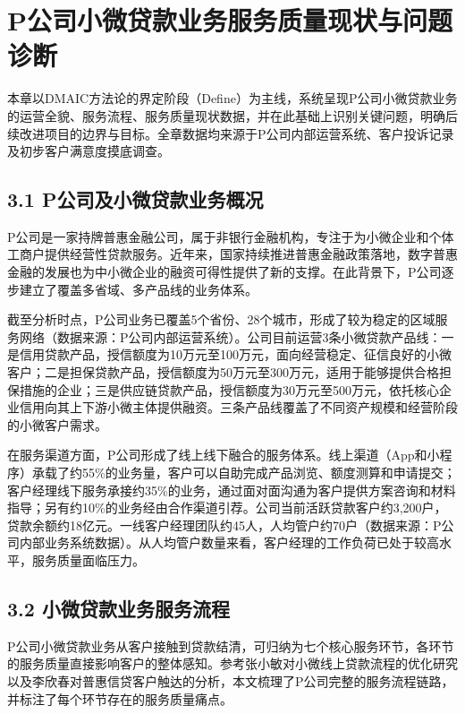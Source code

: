 \chapter{P公司小微贷款业务服务质量现状与问题诊断}

本章以DMAIC方法论的界定阶段（Define）为主线，系统呈现P公司小微贷款业务的运营全貌、服务流程、服务质量现状数据，并在此基础上识别关键问题，明确后续改进项目的边界与目标。全章数据均来源于P公司内部运营系统、客户投诉记录及初步客户满意度摸底调查。\par

\section{3.1 P公司及小微贷款业务概况}

P公司是一家持牌普惠金融公司，属于非银行金融机构，专注于为小微企业和个体工商户提供经营性贷款服务。近年来，国家持续推进普惠金融政策落地，数字普惠金融的发展也为中小微企业的融资可得性提供了新的支撑\cite{ref7,ref2}。在此背景下，P公司逐步建立了覆盖多省域、多产品线的业务体系。\par

截至分析时点，P公司业务已覆盖5个省份、28个城市，形成了较为稳定的区域服务网络（数据来源：P公司内部运营系统）。公司目前运营3条小微贷款产品线：一是信用贷款产品，授信额度为10万元至100万元，面向经营稳定、征信良好的小微客户；二是担保贷款产品，授信额度为50万元至300万元，适用于能够提供合格担保措施的企业；三是供应链贷款产品，授信额度为30万元至500万元，依托核心企业信用向其上下游小微主体提供融资。三条产品线覆盖了不同资产规模和经营阶段的小微客户需求。\par

在服务渠道方面，P公司形成了线上线下融合的服务体系。线上渠道（App和小程序）承载了约55\%的业务量，客户可以自助完成产品浏览、额度测算和申请提交；客户经理线下服务承接约35\%的业务，通过面对面沟通为客户提供方案咨询和材料指导；另有约10\%的业务经由合作渠道引荐。公司当前活跃贷款客户约3,200户，贷款余额约18亿元。一线客户经理团队约45人，人均管户约70户（数据来源：P公司内部业务系统数据）。从人均管户数量来看，客户经理的工作负荷已处于较高水平，服务质量面临压力。\par

\section{3.2 小微贷款业务服务流程}

P公司小微贷款业务从客户接触到贷款结清，可归纳为七个核心服务环节，各环节的服务质量直接影响客户的整体感知。参考张小敏\cite{ref11}对小微线上贷款流程的优化研究以及李欣春\cite{ref55}对普惠信贷客户触达的分析，本文梳理了P公司完整的服务流程链路，并标注了每个环节存在的服务质量痛点。\par

